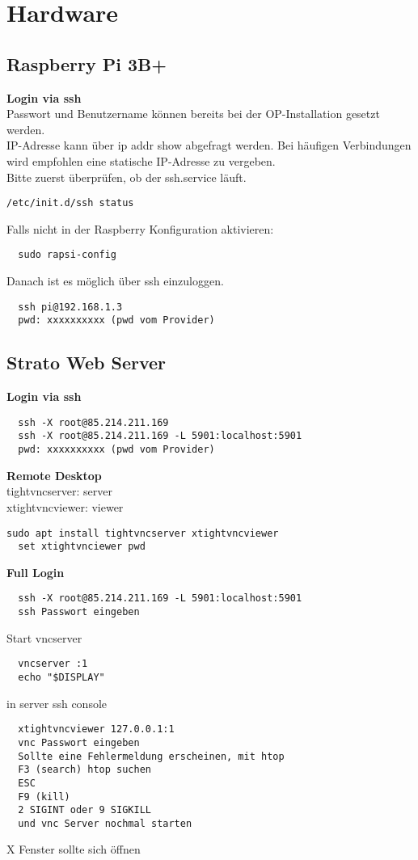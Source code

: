 \newpage
\section{Hardware}

\subsection{Raspberry Pi 3B+}
\textbf{Login via ssh}\\
Passwort und Benutzername können bereits bei der OP-Installation gesetzt werden.\\
IP-Adresse kann über ip addr show abgefragt werden. Bei häufigen Verbindungen wird empfohlen 
eine statische IP-Adresse zu vergeben.\\

Bitte zuerst überprüfen, ob der ssh.service läuft.
\begin{verbatim}/etc/init.d/ssh status\end{verbatim}
Falls nicht in der Raspberry Konfiguration aktivieren:
\begin{verbatim}
  sudo rapsi-config
\end{verbatim}
Danach ist es möglich über ssh einzuloggen.
\begin{verbatim}
  ssh pi@192.168.1.3
  pwd: xxxxxxxxxx (pwd vom Provider)
\end{verbatim}

\subsection{Strato Web Server}
\textbf{Login via ssh}
\begin{verbatim}
  ssh -X root@85.214.211.169
  ssh -X root@85.214.211.169 -L 5901:localhost:5901
  pwd: xxxxxxxxxx (pwd vom Provider)
\end{verbatim}
\textbf{Remote Desktop}\\
tightvncserver: server\\
xtightvncviewer: viewer
\begin{verbatim}sudo apt install tightvncserver xtightvncviewer
  set xtightvnciewer pwd
\end{verbatim}

\textbf{Full Login}
\begin{verbatim}
  ssh -X root@85.214.211.169 -L 5901:localhost:5901
  ssh Passwort eingeben
\end{verbatim}
Start vncserver
\begin{verbatim}
  vncserver :1
  echo "$DISPLAY"
\end{verbatim}
in server ssh console
\begin{verbatim}
  xtightvncviewer 127.0.0.1:1
  vnc Passwort eingeben
  Sollte eine Fehlermeldung erscheinen, mit htop
  F3 (search) htop suchen 
  ESC
  F9 (kill)
  2 SIGINT oder 9 SIGKILL
  und vnc Server nochmal starten
\end{verbatim}
X Fenster sollte sich öffnen\\

